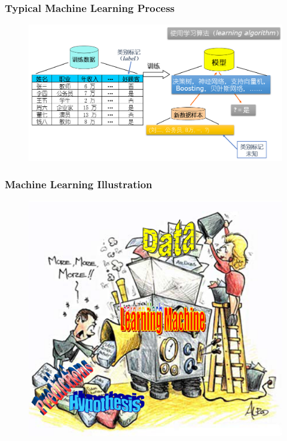 \documentclass[9pt]{beamer}
\begin{document}
\begin{CJK*}{GBK}{kai}
\begin{frame}
\begin{figure}[h]
	\end{figure}
	
\end{frame}

\begin{frame}
	\frametitle{Typical Machine Learning Process}
	\begin{figure}[h]
		\centering
		\includegraphics[scale=0.4]{TypicalMLProcess.png}
	\end{figure}
\end{frame}

\begin{frame}
	\frametitle{Machine Learning Illustration}
	\begin{figure}[h]
		\centering
		\includegraphics[scale=0.5]{MLillustration.png}		
	\end{figure}
	

\end{frame}
\end{CJK*}
\end{document}
